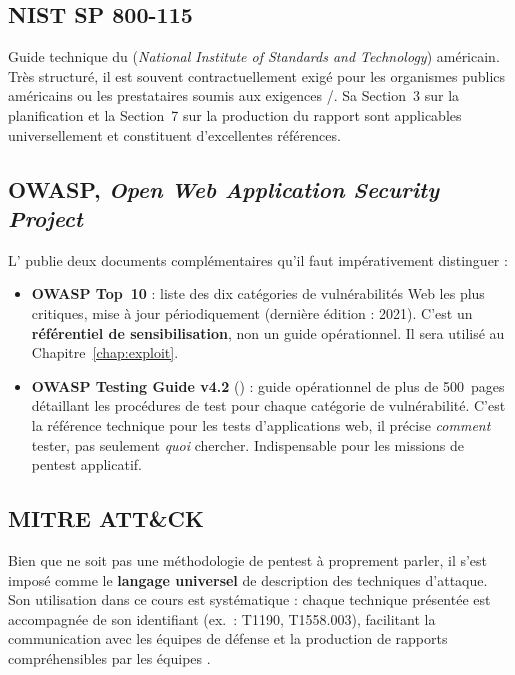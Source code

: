 \subsection{NIST SP 800-115}
\label{subsec:nist}

Guide technique du  (\textit{National Institute of Standards and
Technology}) américain. Très structuré, il est souvent contractuellement exigé
pour les organismes publics américains ou les prestataires soumis aux exigences
/. Sa Section~3 sur la planification et la Section~7
sur la production du rapport sont applicables universellement et constituent
d'excellentes références.

\subsection{OWASP, \textit{Open Web Application Security Project}}
\label{subsec:owasp}

L' publie deux documents complémentaires qu'il faut impérativement
distinguer :

\begin{itemize}
    \item \textbf{OWASP Top~10} : liste des dix catégories de vulnérabilités
          Web les plus critiques, mise à jour périodiquement (dernière édition :
          2021). C'est un \textbf{référentiel de sensibilisation}, non un guide
          opérationnel. Il sera utilisé au Chapitre~\ref{chap:exploit}.

    \item \textbf{OWASP Testing Guide v4.2} () : guide opérationnel
          de plus de 500~pages détaillant les procédures de test pour chaque
          catégorie de vulnérabilité. C'est la référence technique pour les
          tests d'applications web, il précise \textit{comment} tester, pas
          seulement \textit{quoi} chercher. Indispensable pour les missions
          de pentest applicatif.
\end{itemize}

\subsection{MITRE ATT\&CK}
\label{subsec:mitre}

Bien que  ne soit pas une méthodologie de pentest à
proprement parler, il s'est imposé comme le \textbf{langage universel} de
description des techniques d'attaque. Son utilisation dans ce cours est
systématique : chaque technique présentée est accompagnée de son identifiant
 (ex.~: T1190, T1558.003), facilitant la communication avec
les équipes de défense et la production de rapports compréhensibles par les
équipes .


